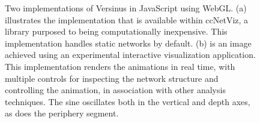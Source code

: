 \documentclass[runningheads]{llncs}
\begin{document}
\begin{figure}[!h]\centering
    \qquad
    \caption{Two implementations of Versinus in JavaScript using WebGL. (a) illustrates the implementation that is available within ccNetViz, a library purposed to being computationally inexpensive. This implementation handles static networks by default. (b) is an image achieved using an experimental interactive visualization application.
    This implementation renders the animations in real time, with multiple controls for inspecting the network structure and controlling the animation, in association with other analysis techniques. The sine oscillates both in the vertical and depth axes, as does the periphery segment.}
    \label{fig:extra}
\end{figure}
\end{document}
